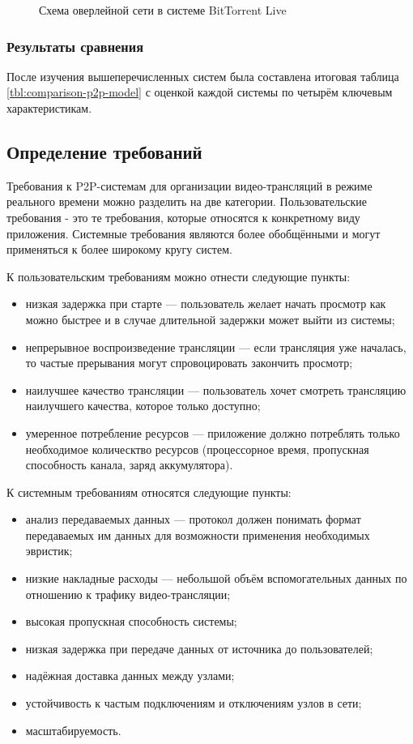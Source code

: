 		\begin{figure}[h]
			\caption{Схема оверлейной сети в системе BitTorrent Live}
			\label{img:btlive-overlay}
		\end{figure}

		\newpage
		\subsubsection{Результаты сравнения}
		После изучения вышеперечисленных систем была составлена итоговая таблица \ref{tbl:comparison-p2p-model} с
		оценкой каждой системы по четырём ключевым характеристикам.

		

	\subsection{Определение требований}
	Требования к P2P-системам для организации видео-трансляций в режиме реального времени можно разделить на две
	категории. Пользовательские требования - это те требования, которые относятся к конкретному виду приложения.
	Системные требования являются более обобщёнными и могут применяться к более широкому кругу систем.

	К пользовательским требованиям можно отнести следующие пункты:
	\begin{itemize}
		\item низкая задержка при старте --- пользователь желает начать просмотр как можно быстрее и в случае
		длительной задержки может выйти из системы;
		\item непрерывное воспроизведение трансляции --- если трансляция уже началась, то частые прерывания могут
		спровоцировать закончить просмотр;
		\item наилучшее качество трансляции --- пользователь хочет смотреть трансляцию наилучшего качества, которое
		только доступно;
		\item умеренное потребление ресурсов --- приложение должно потреблять только необходимое колическтво
		ресурсов (процессорное время, пропускная способность канала, заряд аккумулятора).
	\end{itemize}

	К системным требованиям относятся следующие пункты:
	\begin{itemize}
		\item анализ передаваемых данных --- протокол должен понимать формат передаваемых им данных для возможности
		применения необходимых эвристик;
		\item низкие накладные расходы --- небольшой объём вспомогательных данных по отношению к трафику
		видео-трансляции;
		\item высокая пропускная способность системы;
		\item низкая задержка при передаче данных от источника до пользователей;
		\item надёжная доставка данных между узлами;
		\item устойчивость к частым подключениям и отключениям узлов в сети;
		\item масштабируемость.
	\end{itemize}

